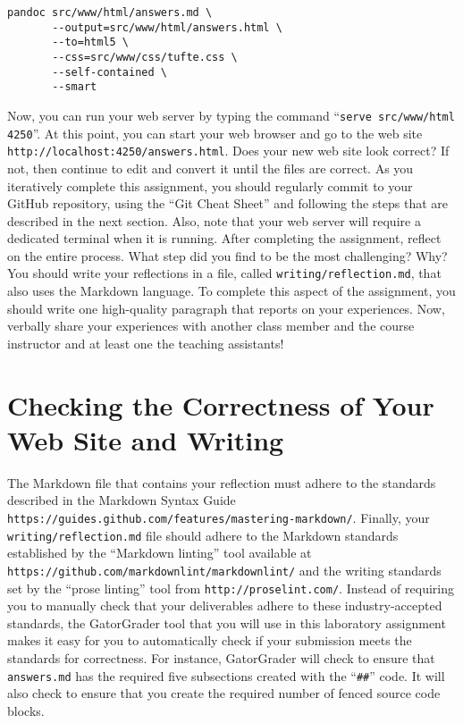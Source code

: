\documentclass[11pt]{article}
\newcommand{\mainprogram}{\lstinline{answers.md}}
\newcommand{\reflection}{\lstinline{writing/reflection.md}}
\newcommand{\command}[1]{``\lstinline{#1}''}
\newcommand{\url}[1]{\lstinline{#1}}
\newcommand{\step}[1]{``{#1}''}
\begin{document}
\vspace*{-.2in}

\begin{verbatim}
pandoc src/www/html/answers.md \
       --output=src/www/html/answers.html \
       --to=html5 \
       --css=src/www/css/tufte.css \
       --self-contained \
       --smart
\end{verbatim}

\vspace*{-.05in}

Now, you can run your web server by typing the command \command{serve
src/www/html 4250}. At this point, you can start your web browser and go to the
web site \url{http://localhost:4250/answers.html}. Does your new web site look
correct? If not, then continue to edit and convert it until the files are
correct. As you iteratively complete this assignment, you should regularly
commit to your GitHub repository, using the ``Git Cheat Sheet'' and following
the steps that are described in the next section. Also, note that your web
server will require a dedicated terminal when it is running. After completing
the assignment, reflect on the entire process. What step did you find to be the
most challenging? Why? You should write your reflections in a file, called
\reflection{}, that also uses the Markdown language. To complete this aspect of
the assignment, you should write one high-quality paragraph that reports on
your experiences. Now, verbally share your experiences with another class
member and the course instructor and at least one the teaching assistants!

\section*{Checking the Correctness of Your Web Site and Writing}

The Markdown file that contains your reflection must adhere to the standards
described in the Markdown Syntax Guide
\url{https://guides.github.com/features/mastering-markdown/}. Finally, your
\reflection{} file should adhere to the Markdown standards established by the
\step{Markdown linting} tool available at
\url{https://github.com/markdownlint/markdownlint/} and the writing standards
set by the \step{prose linting} tool from \url{http://proselint.com/}. Instead
of requiring you to manually check that your deliverables adhere to these
industry-accepted standards, the GatorGrader tool that you will use in this
laboratory assignment makes it easy for you to automatically check if your
submission meets the standards for correctness. For instance, GatorGrader will
check to ensure that \mainprogram{} has the required five subsections created
with the \command{##} code. It will also check to ensure that you create the
required number of fenced source code blocks.
\end{document}
